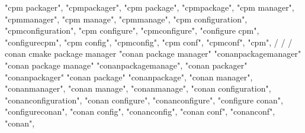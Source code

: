         "cpm packager",  
        "cpmpackager",  
        "cpm package",  
        "cpmpackage",  
        "cpm manager",  
        "cpmmanager",  
        "cpm manage",  
        "cpmmanage",  
        "cpm configuration",  
        "cpmconfiguration",  
        "cpm configure",  
        "cpmconfigure",  
        "configure cpm",  
        "configurecpm",  
        "cpm config",  
        "cpmconfig",  
        "cpm conf",  
        "cpmconf",  
        "cpm",  
        /
        / 
        / conan cmake package manager
        "conan package manager"
        "conanpackagemanager" 
        "conan package manage"
        "conanpackagemanage",
        "conan packager"
        "conanpackager"
        "conan package"
        "conanpackage", 
        "conan manager",
        "conanmanager", 
        "conan manage", 
        "conanmanage",
        "conan configuration", 
        "conanconfiguration",
        "conan configure",
        "conanconfigure",
        "configure conan",
        "configureconan",
        "conan config",
        "conanconfig",
        "conan conf",
        "conanconf",
        "conan",
